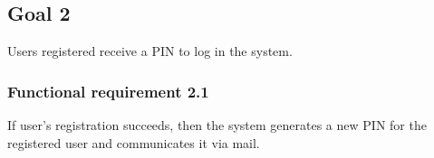 \subsection{Goal 2}
Users registered receive a PIN to log in the system.

\setcounter{secnumdepth}{3}
\subsubsection{Functional requirement 2.1}
If user's registration succeeds, then the system generates a new PIN for the registered user and communicates it via mail.